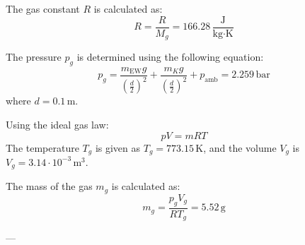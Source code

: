 The gas constant \( R \) is calculated as:  
\[
R = \frac{R}{M_g} = 166.28 \, \frac{\text{J}}{\text{kg·K}}
\]  

The pressure \( p_g \) is determined using the following equation:  
\[
p_g = \frac{m_{\text{EW}} g}{\left(\frac{d}{2}\right)^2} + \frac{m_K g}{\left(\frac{d}{2}\right)^2} + p_{\text{amb}} = 2.259 \, \text{bar}
\]  
where \( d = 0.1 \, \text{m} \).  

Using the ideal gas law:  
\[
p V = m R T
\]  
The temperature \( T_g \) is given as \( T_g = 773.15 \, \text{K} \), and the volume \( V_g \) is \( V_g = 3.14 \cdot 10^{-3} \, \text{m}^3 \).  

The mass of the gas \( m_g \) is calculated as:  
\[
m_g = \frac{p_g V_g}{R T_g} = 5.52 \, \text{g}
\]  

---